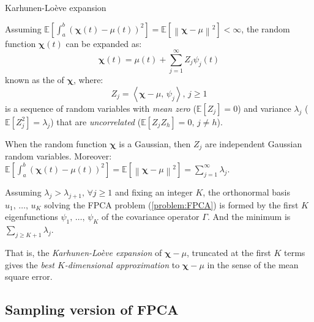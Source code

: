 \begin{definition}{Karhunen-Loève expansion}{}

	Assuming $\mathds E \left[ \int_a^b \left( \boldsymbol \chi(t) - \mu(t) \right)^2 \right]
		= \mathds E \left[ \left\lVert \boldsymbol \chi - \mu \right\rVert^2 \right] < \infty$,
	the random function $\boldsymbol \chi(t)$ can be expanded as:
	\begin{equation*}
		\boldsymbol \chi(t) = \mu(t) + \sum_{j=1}^\infty Z_j\psi_j(t)
	\end{equation*}
	known as the  of $\boldsymbol \chi$, where:
	\begin{equation*}
		Z_j = \left\langle \boldsymbol \chi - \mu,\, \psi_j \right\rangle,\,j \geq 1
	\end{equation*}
	is a sequence of random variables with \emph{mean zero} (${\mathds E[Z_j] = 0}$)
	and variance $\lambda_j$ (${\mathds E[Z_j^2] = \lambda_j}$)
	that are \emph{uncorrelated} (${\mathds E[Z_j Z_h] = 0},\,j \neq h$).

	\tcblower

	\begin{note}
		When the random function $\boldsymbol \chi$ is a Gaussian, then $Z_j$ are
		independent Gaussian random variables.
		\tcbline
		Moreover: $\mathds E \left[ \int_a^b \left( \boldsymbol \chi(t) - \mu(t) \right)^2 \right]
			= \mathds E \left[ \left\lVert \boldsymbol \chi - \mu \right\rVert^2 \right]
			= \sum_{j=1}^\infty \lambda_j$.
	\end{note}
\end{definition}

\begin{prop}{}{}
	Assuming $\lambda_j > \lambda_{j+1},\,\forall j \geq 1$ and fixing an integer $K$,
    the orthonormal basis $u_1,\, \dots,\, u_K$ solving the FPCA problem (\ref{problem:FPCA}) is
	formed by the first $K$ eigenfunctions $\psi_1,\, \dots,\, \psi_K$ of the covariance
	operator $\Gamma$. And the minimum is $\sum_{j\geq K+1} \lambda_j$.

    \tcblower

	\begin{marker}
		That is, the \emph{Karhunen-Loève expansion} of $\boldsymbol \chi - \mu$,
		truncated at the first $K$ terms gives the \emph{best $K$-dimensional approximation}
		to $\boldsymbol \chi - \mu$ in the sense of the mean square error.
	\end{marker}
\end{prop}

\subsection{Sampling version of FPCA}


